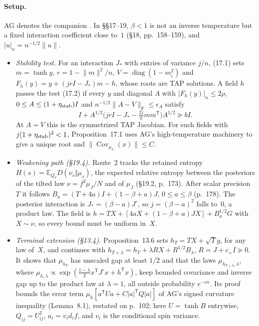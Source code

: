 \documentclass[11pt]{article}
\newcommand{\E}{\mathbb{E}}
\DeclareMathOperator{\Cov}{Cov}
\newcommand{\norm}[1]{\lVert #1\rVert}
\newcommand{\ploc}[2]{#1}
\begin{document}
\paragraph{Setup.}
AG denotes the companion \cite{OAI-AcceptedGap}. In \S\S17--19, $\beta<1$ is
not an inverse temperature but a fixed interaction coefficient close to~$1$
\ploc{(\S18, pp.~158--159)}{cap-initialization.tex:39--66}, and
$|u|_n=n^{-1/2}\norm u$.
\begin{itemize}
\item \emph{Stability test.} For an interaction $J_*$ with entries of variance
 $j/n$, \ploc{(17.1)}{cap-classical.tex:17--21} sets $m=\tanh y$,
 $r=1-\norm m^2/n$, $V=\operatorname{diag}(1-m_i^2)$ and
 $F_h(y)=y+(jrI-J_*)m-h$, whose roots are TAP solutions. A field $h$ passes
 the test \ploc{(17.2)}{cap-classical.tex:24--38} if every $y$ and diagonal
 $A$ with $|F_h(y)|_n\le2\rho$, $0\le A\le(1+\eta_{\rm stab})I$ and
 $n^{-1/2}\norm{A-V}_{\mathrm F}\le\epsilon_A$ satisfy
 \[
  I+A^{1/2}\bigl(jrI-J_*-\tfrac{2j}{n}mm^{\mathsf T}\bigr)A^{1/2}\succeq bI .
 \]
 At $A=V$ this is the symmetrized TAP Jacobian. For such fields with
 $j(1+\eta_{\rm stab})^2<1$,
 \ploc{Proposition~17.1}{cap-classical.tex:45--79} uses AG's
 high-temperature machinery to give a unique root and
 $\norm{\Cov_{\mu_h}(x)}\le C$.
\item \emph{Weakening path (\S19.4).} Route~2 tracks the retained entropy
 $H(s)=\E_{Q_\nu}D(\nu_s\Vert\mu_s)$, the expected relative entropy between
 the posteriors of the tilted law $\nu=f^2\mu_J/N$ and of $\mu_J$
 \ploc{(\S19.2, p.~173)}{cap-entropy.tex:160--175}. After scalar precision
 $T$ it follows $B_a=(T+4a)I+(1-\beta+a)J$, $0\le a\le\beta$
 \ploc{(p.~178)}{cap-entropy.tex:531--535}. The posterior interaction is
 $J_*=(\beta-a)J^\circ$, so $j=(\beta-a)^2$ falls to~$0$, a product law. The
 field is $h=TX+[4aX+(1-\beta+a)JX]+B_a^{1/2}G$ with $X\sim\nu$, so every
 bound must be uniform in~$X$.
\item \emph{Terminal extension (\S13.4).}
 \ploc{Proposition~13.6}{profile-positive.tex:1556--1582} sets
 $h_T=TX+\sqrt Tg$, for any law of~$X$, and continues with
 $h_{T+\lambda}=h_T+\lambda RX+R^{1/2}B_\lambda$, $R=J+c_+I\succeq0$. It shows
 that $\mu_{h_T}$ has unscaled gap at least $1/2$ and that the laws
 $\mu_{h_{T+\lambda},\lambda}$, where
 $\mu_{h,\lambda}\propto\exp(\frac{1-\lambda}2x^{\mathsf T}J^\circ x+h^{\mathsf T}x)$,
 keep bounded covariance and inverse gap up to the product law at
 $\lambda=1$, all outside probability $e^{-cn}$. Its proof bounds the error
 term $\mu_h[a^{\mathsf T}Ua+C|a|^{\mathsf T}Q|a|]$ of AG's signed curvature
 inequality \ploc{(Lemma~8.1)}{terminal.tex:32--33}, restated
 \ploc{on p.~102}{profile-positive.tex:1588--1596}; here $U=\tanh B$
 entrywise, $Q_{ij}=U_{ij}^2$, $a_i=v_id_if$, and $v_i$ is the conditional
 spin variance.
\end{itemize}
\end{document}
